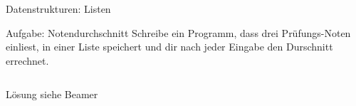 \begin{frame}[fragile]{Datenstrukturen: Listen}
\begin{block}{Aufgabe: Notendurchschnitt}
Schreibe ein Programm, dass drei Prüfungs-Noten einliest, in einer
Liste speichert und dir nach jeder Eingabe den Durschnitt errechnet. 
\end{block}
\begin{lstlisting}

\end{lstlisting}
\pause{}
\begin{exampleblock}{Lösung}
siehe Beamer
\end{exampleblock}
\end{frame}

